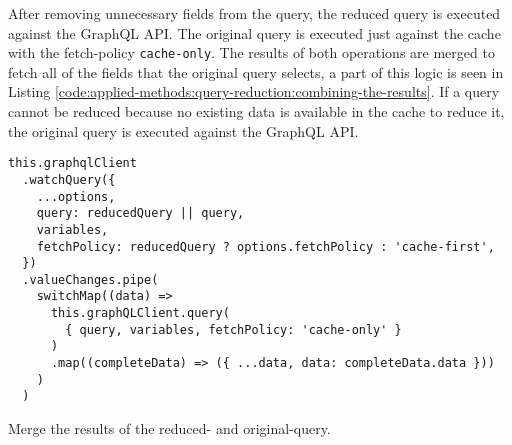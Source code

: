 \noindent After removing unnecessary fields from the query, the reduced query is executed against the GraphQL \ac{API}. The original query is executed just against the cache with the fetch-policy \texttt{cache-only}. The results of both operations are merged to fetch all of the fields that the original query selects, a part of this logic is seen in Listing \ref{code:applied-methods:query-reduction:combining-the-results}. If a query cannot be reduced because no existing data is available in the cache to reduce it, the original query is executed against the GraphQL \ac{API}.

\ifshowListings
\begin{listing}[H]
\begin{verbatim}
this.graphqlClient
  .watchQuery({
    ...options,
    query: reducedQuery || query,
    variables,
    fetchPolicy: reducedQuery ? options.fetchPolicy : 'cache-first',
  })
  .valueChanges.pipe(
    switchMap((data) =>
      this.graphQLClient.query(
        { query, variables, fetchPolicy: 'cache-only' }
      )
      .map((completeData) => ({ ...data, data: completeData.data }))
    )
  )
\end{verbatim}
\caption{Merge the results of the reduced- and original-query.}\label{code:applied-methods:query-reduction:combining-the-results}
\end{listing}
\fi
